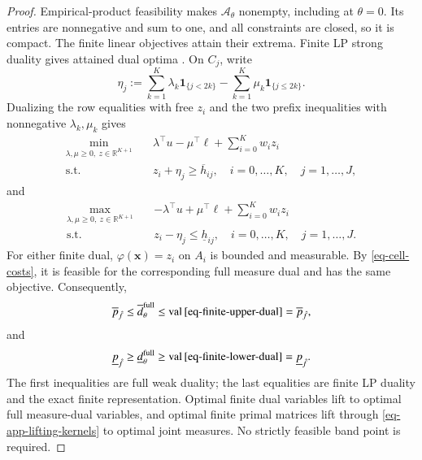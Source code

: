 \begin{proof}
  Empirical-product feasibility makes $\mathcal A_\theta$ nonempty, including at $\theta=0$. Its entries are nonnegative and sum to one, and all constraints are closed, so it is compact. The finite linear objectives attain their extrema. Finite LP strong duality gives attained dual optima \citep[Section~5.2.3]{B.V04}. On $C_j$, write
  \begin{equation}
    \eta_j:=\sum_{k=1}^K\lambda_k\mathbf1_{\{j<2k\}}
    -\sum_{k=1}^K\mu_k\mathbf1_{\{j\le2k\}}.
    \label{eq-dual-cell-values}
  \end{equation}
  Dualizing the row equalities with free $z_i$ and the two prefix inequalities with nonnegative $\lambda_k,\mu_k$ gives
  \begin{equation}
    \begin{aligned}
      \min_{\lambda,\mu\ge0,\ z\in\mathbb R^{K+1}}\quad&
      \lambda^\top u-\mu^\top\ell+\sum_{i=0}^K w_i z_i\\
      \text{s.t.}\quad&z_i+\eta_j\ge\overline h_{ij},
      \quad i=0,\ldots,K,\quad j=1,\ldots,J,
    \end{aligned}
    \label{eq-finite-upper-dual}
  \end{equation}
  and
  \begin{equation}
    \begin{aligned}
      \max_{\lambda,\mu\ge0,\ z\in\mathbb R^{K+1}}\quad&
      -\lambda^\top u+\mu^\top\ell+\sum_{i=0}^K w_i z_i\\
      \text{s.t.}\quad&z_i-\eta_j\le\underline h_{ij},
      \quad i=0,\ldots,K,\quad j=1,\ldots,J.
    \end{aligned}
    \label{eq-finite-lower-dual}
  \end{equation}
  For either finite dual, $\varphi(\bm x)=z_i$ on $A_i$ is bounded and measurable. By \eqref{eq-cell-costs}, it is feasible for the corresponding full measure dual and has the same objective. Consequently,
  \[
    \overline p_{\hat f}\le\overline d_\theta^{\mathrm{full}}
    \le\operatorname{val}\eqref{eq-finite-upper-dual}
    =\overline p_{\hat f},
  \]
  and
  \[
    \underline p_{\hat f}\ge\underline d_\theta^{\mathrm{full}}
    \ge\operatorname{val}\eqref{eq-finite-lower-dual}
    =\underline p_{\hat f}.
  \]
  The first inequalities are full weak duality; the last equalities are finite LP duality and the exact finite representation. Optimal finite dual variables lift to optimal full measure-dual variables, and optimal finite primal matrices lift through \eqref{eq-app-lifting-kernels} to optimal joint measures. No strictly feasible band point is required.
\end{proof}

